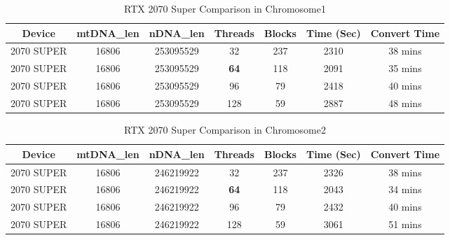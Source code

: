 \documentclass[PhD]{PHlab-thesis}
\begin{document}
\begin{table}[h]
    \centering
    \caption{RTX 2070 Super Comparison in Chromosome1}
    \label{tab:20701}
    \begin{tabular}{|c|c|c|c|c|c|c|}
        \hline
         \textbf{Device} & \textbf{mtDNA\_len}& \textbf{nDNA\_len}& \textbf{Threads} & \textbf{Blocks} & \textbf{Time (Sec)} & \textbf{Convert Time} \\
        \hline
         2070 SUPER & 16806 & 253095529 & 32 & 237 & 2310 & 38 mins \\
        \hline
         \rowcolor{yellow}
         2070 SUPER & 16806 & 253095529 & \textbf{64} & 118 & 2091 & 35 mins \\
        \hline
         2070 SUPER & 16806 & 253095529 & 96 & 79 & 2418 & 40 mins \\
        \hline
         2070 SUPER & 16806 & 253095529 & 128 & 59 & 2887 & 48 mins \\
         \hline
    \end{tabular}
\end{table}

\begin{table}[h]
    \centering
    \caption{RTX 2070 Super Comparison in Chromosome2}
    \label{tab:20702}
    \begin{tabular}{|c|c|c|c|c|c|c|}
        \hline
         \textbf{Device} & \textbf{mtDNA\_len}& \textbf{nDNA\_len}& \textbf{Threads} & \textbf{Blocks} & \textbf{Time (Sec)} & \textbf{Convert Time} \\
        \hline
         2070 SUPER & 16806 & 246219922 & 32 & 237 & 2326 & 38 mins \\
        \hline
         \rowcolor{yellow}
         2070 SUPER & 16806 & 246219922 & \textbf{64} & 118 & 2043 & 34 mins \\
        \hline
         2070 SUPER & 16806 & 246219922 & 96 & 79 & 2432 & 40 mins \\
        \hline
         2070 SUPER & 16806 & 246219922 & 128 & 59 & 3061 & 51 mins \\
         \hline
    \end{tabular}
\end{table}
\end{document}
